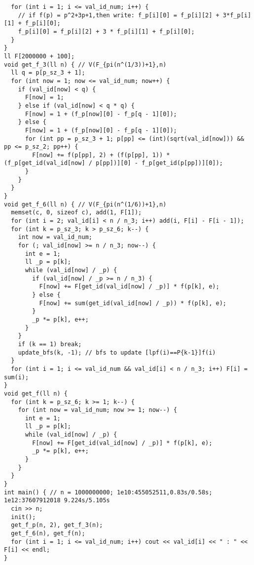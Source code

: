 \begin{lstlisting}
  for (int i = 1; i <= val_id_num; i++) {
    // if f(p) = p^2+3p+1,then write: f_p[i][0] = f_p[i][2] + 3*f_p[i][1] + f_p[i][0];
    f_p[i][0] = f_p[i][2] + 3 * f_p[i][1] + f_p[i][0];
  }
}
ll F[2000000 + 100];
void get_f_3(ll n) { // V(F_{pi(n^(1/3))+1},n)
  ll q = p[p_sz_3 + 1];
  for (int now = 1; now <= val_id_num; now++) {
    if (val_id[now] < q) {
      F[now] = 1;
    } else if (val_id[now] < q * q) {
      F[now] = 1 + (f_p[now][0] - f_p[q - 1][0]);
    } else {
      F[now] = 1 + (f_p[now][0] - f_p[q - 1][0]);
      for (int pp = p_sz_3 + 1; p[pp] <= (int)(sqrt(val_id[now])) && pp <= p_sz_2; pp++) {
        F[now] += f(p[pp], 2) + (f(p[pp], 1)) * (f_p[get_id(val_id[now] / p[pp])][0] - f_p[get_id(p[pp])][0]);
      }
    }
  }
}
void get_f_6(ll n) { // V(F_{pi(n^(1/6))+1},n)
  memset(c, 0, sizeof c), add(1, F[1]);
  for (int i = 2; val_id[i] < n / n_3; i++) add(i, F[i] - F[i - 1]);
  for (int k = p_sz_3; k > p_sz_6; k--) {
    int now = val_id_num;
    for (; val_id[now] >= n / n_3; now--) {
      int e = 1;
      ll _p = p[k];
      while (val_id[now] / _p) {
        if (val_id[now] / _p >= n / n_3) {
          F[now] += F[get_id(val_id[now] / _p)] * f(p[k], e);
        } else {
          F[now] += sum(get_id(val_id[now] / _p)) * f(p[k], e);
        }
        _p *= p[k], e++;
      }
    }
    if (k == 1) break;
    update_bfs(k, -1); // bfs to update [lpf(i)==P{k-1}]f(i)
  }
  for (int i = 1; i <= val_id_num && val_id[i] < n / n_3; i++) F[i] = sum(i);
}
void get_f(ll n) {
  for (int k = p_sz_6; k >= 1; k--) {
    for (int now = val_id_num; now >= 1; now--) {
      int e = 1;
      ll _p = p[k];
      while (val_id[now] / _p) {
        F[now] += F[get_id(val_id[now] / _p)] * f(p[k], e);
        _p *= p[k], e++;
      }
    }
  }
}
int main() { // n = 1000000000; 1e10:455052511,0.83s/0.58s; 1e12:37607912018 9.224s/5.105s
  cin >> n;
  init();
  get_f_p(n, 2), get_f_3(n);
  get_f_6(n), get_f(n);
  for (int i = 1; i <= val_id_num; i++) cout << val_id[i] << " : " << F[i] << endl;
}
\end{lstlisting}